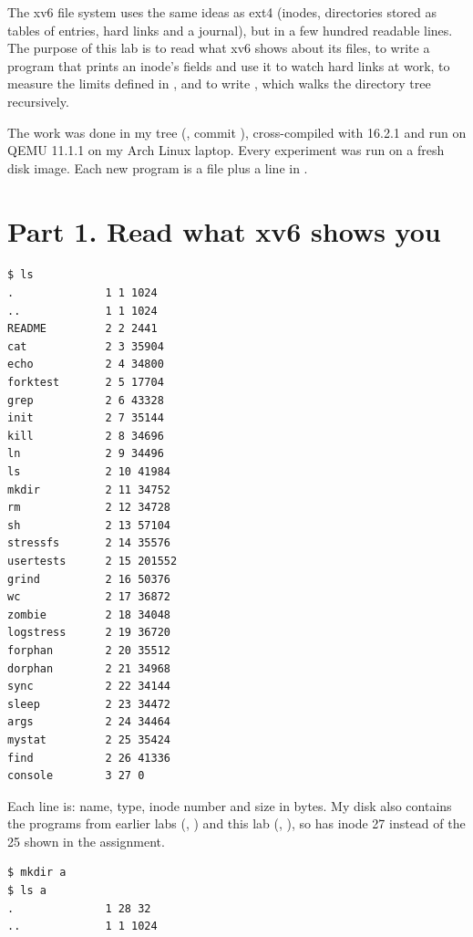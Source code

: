 \documentclass[11pt,a4paper]{article}
\begin{document}
\utmtitlepage
\tableofcontents
\newpage


The xv6 file system uses the same ideas as ext4 (inodes, directories stored as tables of
entries, hard links and a journal), but in a few hundred readable lines. The purpose of this lab
is to read what xv6 shows about its files, to write a  program that prints an
inode's fields and use it to watch hard links at work, to measure the limits defined in
, and to write , which walks the directory tree recursively.

The work was done in my  tree (, commit
), cross-compiled with  16.2.1 and run on QEMU 11.1.1
on my Arch Linux laptop. Every experiment was run on a fresh disk image. Each new program is a
file  plus a line  in .

\section{Part 1. Read what xv6 shows you}

\begin{lstlisting}[caption={ls on a fresh xv6 disk}]
$ ls
.              1 1 1024
..             1 1 1024
README         2 2 2441
cat            2 3 35904
echo           2 4 34800
forktest       2 5 17704
grep           2 6 43328
init           2 7 35144
kill           2 8 34696
ln             2 9 34496
ls             2 10 41984
mkdir          2 11 34752
rm             2 12 34728
sh             2 13 57104
stressfs       2 14 35576
usertests      2 15 201552
grind          2 16 50376
wc             2 17 36872
zombie         2 18 34048
logstress      2 19 36720
forphan        2 20 35512
dorphan        2 21 34968
sync           2 22 34144
sleep          2 23 34472
args           2 24 34464
mystat         2 25 35424
find           2 26 41336
console        3 27 0
\end{lstlisting}

Each line is: name, type, inode number and size in bytes. My disk also contains the programs
from earlier labs (, ) and this lab (, ), so
 has inode 27 instead of the 25 shown in the assignment.

\begin{lstlisting}[caption={An empty directory}]
$ mkdir a
$ ls a
.              1 28 32
..             1 1 1024
\end{lstlisting}
\end{document}
